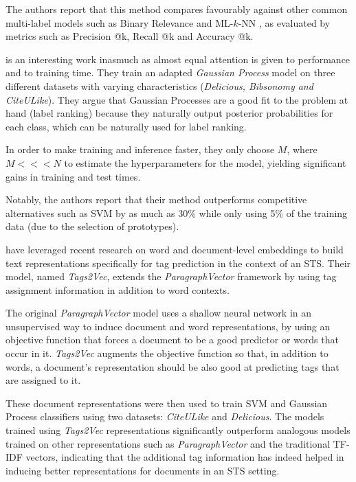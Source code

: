 The authors report that this method compares favourably against other common multi-label models such as Binary Relevance and ML-$k$-NN \citep{zhang_zhou_2007}, as evaluated by metrics such as Precision @k, Recall @k and Accuracy @k.

\cite{song_etal_2011} is an interesting work inasmuch as almost equal attention is given to performance and to training time. They train an adapted \textit{Gaussian Process} model on three different datasets with varying characteristics (\textit{Delicious, Bibsonomy and CiteULike}). They argue that Gaussian Processes are a good fit to the problem at hand (label ranking) because they naturally output posterior probabilities for each class, which can be naturally used for label ranking.

In order to make training and inference faster, they only choose $M$, where $M <<< N$ to estimate the hyperparameters for the model, yielding significant gains in training and test times.

Notably, the authors report that their method outperforms competitive alternatives such as SVM by as much as 30\% while only using 5\% of the training data (due to the selection of prototypes).

\cite{kataria_agarwal_2015} have leveraged recent research on word and document-level embeddings \citep{mikolov_etal_2013,le_mikolov_2014} to build text representations specifically for tag prediction in the context of an STS. Their model, named \textit{Tags2Vec}, extends the   \textit{ParagraphVector} framework by using tag assignment information in addition to word contexts. 

The original \textit{ParagraphVector} model uses a shallow neural network in an unsupervised way to induce document and word representations, by using an objective function that forces a document to be a good predictor or words that occur in it. \textit{Tags2Vec} augments the objective function so that, in addition to words, a document's representation should be also good at predicting tags that are assigned to it.

These document representations were then used to train SVM and Gaussian Process classifiers using two datasets: \textit{CiteULike} and \textit{Delicious}. The models trained using \textit{Tags2Vec} representations significantly outperform analogous models trained on other representations such as \textit{ParagraphVector} and the traditional TF-IDF vectors, indicating that the additional tag information has indeed helped in inducing better representations for documents in an STS setting.

